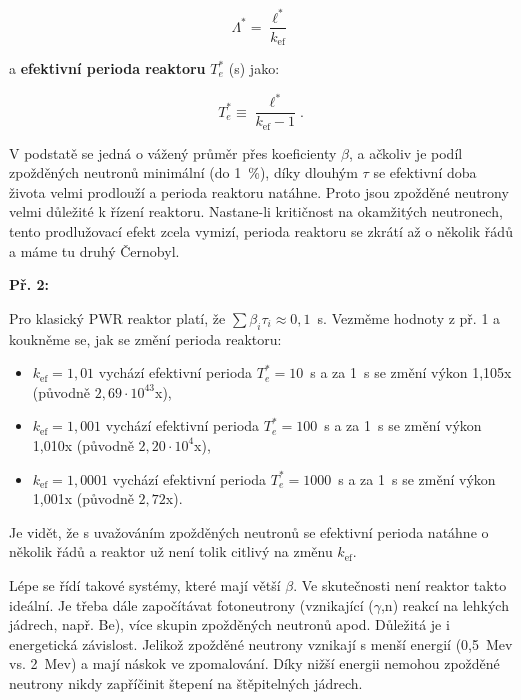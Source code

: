 \begin{equation}
  \boxed{
  \Lambda^* = \dfrac{\ell^*}{k_{\text{ef}}}
  \label{efektivni_stredni_doba_vzniku}}
\end{equation}

a \textbf{efektivní perioda reaktoru} $T_e^*$ (s) jako:

\begin{equation}
  \boxed{
  T_e^* \equiv \dfrac{\ell^*}{k_{\text{ef}} - 1}.
  \label{efektivni_perioda}}
\end{equation}

V podstatě se jedná o vážený průměr přes koeficienty $\beta$, a ačkoliv je podíl zpožděných neutronů minimální (do 1~\%), díky dlouhým $\tau$ se efektivní doba života velmi prodlouží a perioda reaktoru natáhne. Proto jsou zpožděné neutrony velmi důležité k řízení reaktoru. Nastane-li kritičnost na okamžitých neutronech, tento prodlužovací efekt zcela vymizí, perioda reaktoru se zkrátí až o několik řádů a máme tu druhý Černobyl.\\

\small

\textbf{Př. 2:}

Pro klasický PWR reaktor platí, že $\sum \beta_i \tau_i \approx 0,1$~s. Vezměme hodnoty z př. 1 a koukněme se, jak se změní perioda reaktoru:

\begin{itemize}
  \item $k_{\text{ef}} = 1,01$ vychází efektivní perioda $T_e^* = 10$~s a za 1~s se změní výkon 1,105x (původně $2,69 \cdot 10^{43}$x),
  \item $k_{\text{ef}} = 1,001$ vychází efektivní perioda $T_e^* = 100$~s a za 1~s se změní výkon 1,010x (původně $2,20 \cdot 10^{4}$x),
  \item $k_{\text{ef}} = 1,0001$ vychází efektivní perioda $T_e^* = 1000$~s a za 1~s se změní výkon 1,001x (původně $2,72$x).
\end{itemize}

Je vidět, že s uvažováním zpožděných neutronů se efektivní perioda natáhne o několik řádů a reaktor už není tolik citlivý na změnu $k_{\text{ef}}$.\\

\normalsize

Lépe se řídí takové systémy, které mají větší $\beta$. Ve skutečnosti není reaktor takto ideální. Je třeba dále započítávat fotoneutrony (vznikající ($\gamma$,n) reakcí na lehkých jádrech, např. Be), více skupin zpožděných neutronů apod. Důležitá je i energetická závislost. Jelikož zpožděné neutrony vznikají s menší energií (0,5~Mev vs. 2~Mev) a mají náskok ve zpomalování. Díky nižší energii nemohou zpožděné neutrony nikdy zapříčinit štepení na štěpitelných jádrech.\\

